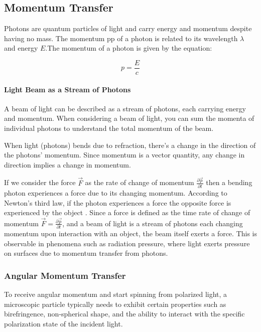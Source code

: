 \documentclass[12pt,english,ngerman]{scrartcl}
\begin{document}
\subsection{Momentum Transfer}\label{sec:momentumTransfer}


Photons are quantum particles of light and carry energy and momentum despite
having no mass. The momentum pp of a photon is related to its wavelength
$\lambda$ and energy $E$\cite{einsteinZurQuantentheoriederStrahlung1917}.The
momentum of a photon is given by the equation:

\begin{equation}
	p = \frac{E}{c}
\end{equation}

\paragraph{Light Beam as a Stream of Photons}

A beam of light can be described as a stream of photons, each carrying energy
and momentum. When considering a beam of light, you can sum the momenta of
individual photons to understand the total momentum of the beam.

When light (photons) bends due to refraction, there's a change in the direction
of the photons' momentum. Since momentum is a vector quantity, any change in
direction implies a change in momentum.

If we consider the force $\vec{F}$ as the rate of change of momentum
$\frac{\partial\vec{p}}{\partial t}$ then a bending photon experiences a force
due to its changing momentum. According to Newton's third law, if the photon
experiences a force the opposite force is experienced by the object . Since a
force is defined as the time rate of change of momentum $\vec{F} =
	\frac{\partial\vec{p}}{\partial t}$, and a beam of light is a stream of photons
each changing momentum upon interaction with an object, the beam itself exerts
a force. This is observable in phenomena such as radiation pressure, where
light exerts pressure on surfaces due to momentum transfer from
photons.\cite{bustamanteOpticalTweezersSinglemolecule2021}


\subsubsection{Angular Momentum Transfer}\label{sec:angularMomentumTransfer}
To receive angular momentum and start spinning from polarized light, a
microscopic particle typically needs to exhibit certain properties such as
birefringence, non-spherical shape, and the ability to interact with the
specific polarization state of the incident light.
\end{document}
